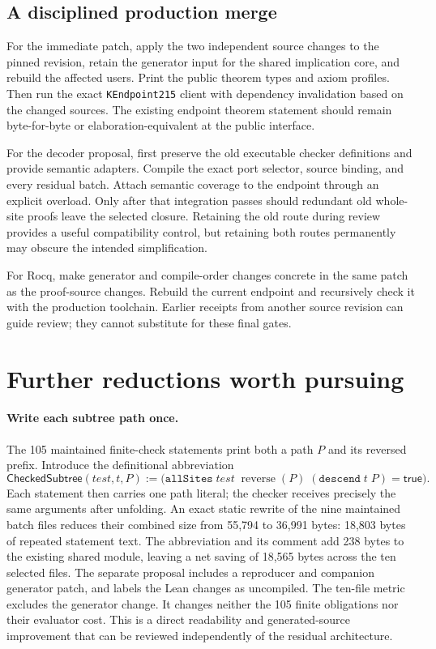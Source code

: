 \documentclass[11pt,letterpaper]{article}
\newcommand{\code}[1]{\texttt{#1}}
\begin{document}
\subsection{A disciplined production merge}

For the immediate patch, apply the two independent source changes to the pinned
revision, retain the generator input for the shared implication core, and rebuild
the affected users. Print the public theorem types and axiom profiles. Then run the
exact \code{KEndpoint215} client with dependency invalidation based on the changed
sources. The existing endpoint theorem statement should remain byte-for-byte or
elaboration-equivalent at the public interface.

For the decoder proposal, first preserve the old executable checker definitions and
provide semantic adapters. Compile the exact port selector, source binding, and every
residual batch. Attach semantic coverage to the endpoint through an explicit overload.
Only after that integration passes should redundant old whole-site proofs leave the
selected closure. Retaining the old route during review provides a useful compatibility
control, but retaining both routes permanently may obscure the intended simplification.

For Rocq, make generator and compile-order changes concrete in the same patch as the
proof-source changes. Rebuild the current endpoint and recursively check it with the
production toolchain. Earlier receipts from another source revision can guide review;
they cannot substitute for these final gates.

\section{Further reductions worth pursuing}

\paragraph{Write each subtree path once.}
The 105 maintained finite-check statements print both a path $P$ and its reversed
prefix. Introduce the definitional abbreviation
\[
 \mathsf{CheckedSubtree}(\mathit{test},t,P)
 := \bigl(\code{allSites}\;\mathit{test}\;
        \operatorname{reverse}(P)\;(\code{descend}\;t\;P)=\mathsf{true}\bigr).
\]
Each statement then carries one path literal; the checker receives precisely the
same arguments after unfolding. An exact static rewrite of the nine maintained
batch files reduces their combined size from 55,794 to 36,991 bytes:
18,803 bytes of repeated statement text. The abbreviation and its comment add
238 bytes to the existing shared module, leaving a net saving of 18,565 bytes
across the ten selected files.
The separate proposal includes a reproducer and companion generator patch, and labels
the Lean changes as uncompiled. The ten-file metric excludes the generator change.
It changes neither the 105 finite obligations nor their evaluator
cost. This is a direct readability and generated-source improvement that can be
reviewed independently of the residual architecture.
\end{document}
